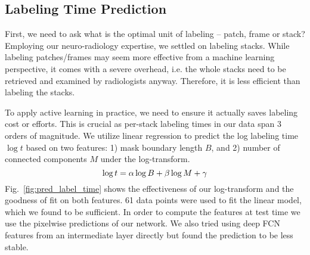 \documentclass{llncs}
\begin{document}

\subsection{Labeling Time Prediction}
\vspace*{-0.05cm}
\label{sect:predtime}
First, we need to ask what is the optimal unit of labeling -- patch, frame or stack? Employing our neuro-radiology expertise, we settled on labeling stacks. While labeling patches/frames may seem more effective from a machine learning perspective, it comes with a severe overhead, i.e. the whole stacks need to be retrieved and examined by radiologists anyway. Therefore, it is less efficient than labeling the stacks.

To apply active learning in practice, we need to ensure it actually saves labeling cost or efforts. This is crucial as per-stack labeling times in our data span $3$ orders of magnitude. We utilize linear regression to predict the log labeling time $\log{t}$ based on two features: 1) mask boundary length $B$, and 2) number of connected components $M$ under the log-transform. 
\vspace*{-0.3cm}
\begin{equation}
    \log{t} = \alpha \log{B} + \beta \log{M} + \gamma
\vspace*{-0.15cm}
\end{equation}
Fig.~\ref{fig:pred_label_time} shows the effectiveness of our log-transform and the goodness of fit on both features. 61 data points were used to fit the linear model, which we found to be sufficient. In order to compute the features at test time we use the pixelwise predictions of our network. We also tried using deep FCN features from an intermediate layer directly but found the prediction to be less stable.
\end{document}
